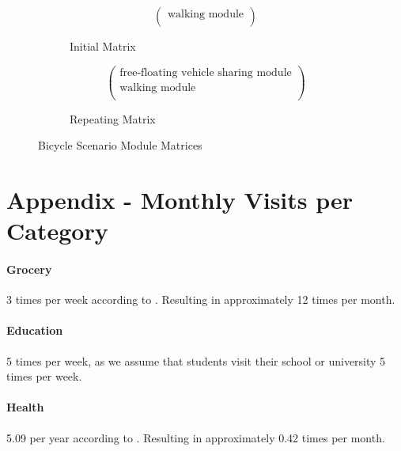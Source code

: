
\begin{figure}[ht]
    \centering
    \begin{subfigure}{0.45\linewidth}
        \centering
        \[
        \begin{pmatrix}
            \text{walking module} \\
        \end{pmatrix}
        \]
        \caption{Initial Matrix}
    \end{subfigure}
    \hfill
    \begin{subfigure}{0.45\linewidth}
        \centering
        \[
        \begin{pmatrix}
            \text{free-floating vehicle sharing module} \\
            \text{walking module} \\
        \end{pmatrix}
        \]
        \caption{Repeating Matrix}
    \end{subfigure}
    \caption{Bicycle Scenario Module Matrices}
    \label{fig:bicycle_scenario_module_matrix}
\end{figure}

\clearpage

\section{Appendix - Monthly Visits per Category}
\label{app:monthly_visits_per_category}

\paragraph{Grocery}
3 times per week according to .
Resulting in approximately 12 times per month.

\paragraph{Education}
5 times per week, as we assume that students visit their school or university 5 times per week.

\paragraph{Health}
5.09 per year according to .
Resulting in approximately 0.42 times per month.

